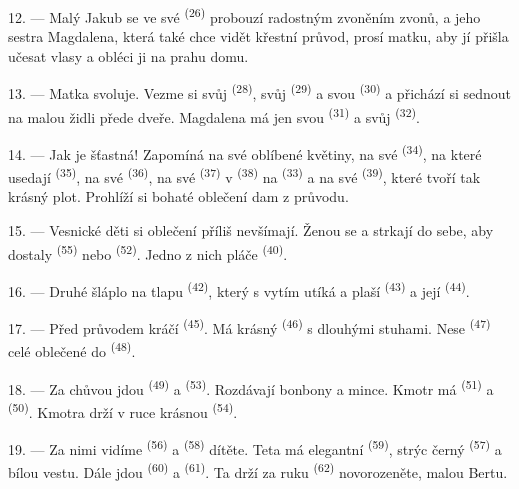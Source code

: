 12. --- Malý Jakub se ve své  \textsuperscript{(26)} probouzí radostným
zvoněním zvonů, a jeho sestra Magdalena, která také chce vidět křestní průvod, prosí matku,
aby jí přišla učesat vlasy a obléci ji na prahu domu.

13. --- Matka svoluje. Vezme si svůj  \textsuperscript{(28)}, svůj
 \textsuperscript{(29)} a svou 
\textsuperscript{(30)} a přichází si sednout na malou židli přede dveře. Magdalena má jen svou
 \textsuperscript{(31)} a svůj 
\textsuperscript{(32)}.

14. --- Jak je šťastná! Zapomíná na své oblíbené květiny, na své 
\textsuperscript{(34)}, na které usedají  \textsuperscript{(35)}, na své
 \textsuperscript{(36)}, na své  \textsuperscript{(37)} v
 \textsuperscript{(38)} na  \textsuperscript{(33)} a na své
 \textsuperscript{(39)}, které tvoří tak krásný plot. Prohlíží si bohaté oblečení
dam z průvodu.

15. --- Vesnické děti si oblečení příliš nevšímají. Ženou se a strkají do sebe, aby dostaly
 \textsuperscript{(55)} nebo  \textsuperscript{(52)}. Jedno z
nich pláče \textsuperscript{(40)}.

16. --- Druhé šláplo na tlapu  \textsuperscript{(42)}, který s vytím utíká a plaší
 \textsuperscript{(43)} a její  \textsuperscript{(44)}.

\VUsaut{5.0mm}
\VUsaut{4.0mm}

17. --- Před průvodem kráčí  \textsuperscript{(45)}. Má krásný
 \textsuperscript{(46)} s dlouhými stuhami. Nese 
\textsuperscript{(47)} celé oblečené do  \textsuperscript{(48)}.

18. --- Za chůvou jdou  \textsuperscript{(49)} a 
\textsuperscript{(53)}. Rozdávají bonbony a mince. Kmotr má 
\textsuperscript{(51)} a  \textsuperscript{(50)}. Kmotra drží v ruce krásnou
 \textsuperscript{(54)}.

19. --- Za nimi vidíme  \textsuperscript{(56)} a 
\textsuperscript{(58)} dítěte. Teta má elegantní  \textsuperscript{(59)},
strýc černý  \textsuperscript{(57)} a bílou vestu. Dále jdou
 \textsuperscript{(60)} a  \textsuperscript{(61)}. Ta
drží za ruku  \textsuperscript{(62)} novorozeněte, malou Bertu.

